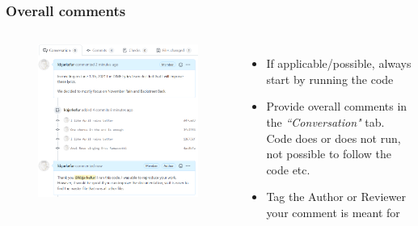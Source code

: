 \documentclass[aspectratio=169]{beamer} %
\begin{document}
\begin{frame}
	\frametitle{Overall comments}
	\begin{columns}[c]
		
		\vspace{-.4cm}
		\begin{figure}
			\centering
			\includegraphics[width=.9\textwidth]{./img/pr-comment.png}
		\end{figure}
		
		\begin{itemize}
			\setlength\itemsep{1em}
			\item If applicable/possible, always start by running the code
			\item Provide overall comments in the \textit{``Conversation"} tab. Code does or does not run, not possible to follow the code etc.
			\item Tag the Author or Reviewer your comment is meant for
		\end{itemize}
		
	\end{columns}
\end{frame}
\end{document}
